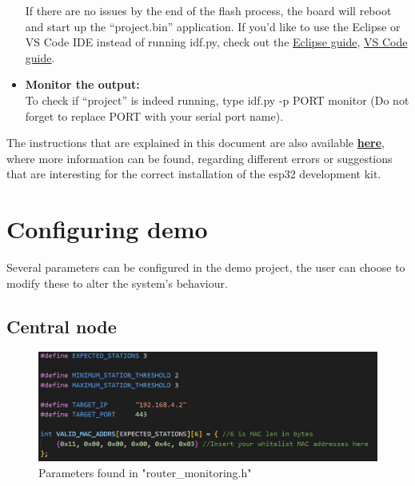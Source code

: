 \begin{itemize}
    If there are no issues by the end of the flash process, the board will reboot and start up the “project.bin” application.
    If you’d like to use the Eclipse or VS Code IDE instead of running idf.py, check out the \hyperlink{https://docs.espressif.com/projects/esp-idf/en/latest/esp32/get-started/eclipse-setup.html}{Eclipse guide}, \hyperlink{https://docs.espressif.com/projects/esp-idf/en/latest/esp32/get-started/vscode-setup.html}{VS Code guide}.\\
    
    \item \textbf{Monitor the output:}\\
    To check if “project” is indeed running, type idf.py -p PORT monitor (Do not forget to replace PORT with your serial port name).
    
\end{itemize}

The instructions that are explained in this document are also available \hyperlink{https://docs.espressif.com/projects/esp-idf/en/latest/esp32/get-started/linux-macos-setup.html}{\textbf{here}}, where more information can be found, regarding different errors or suggestions that are interesting for the correct installation of the esp32 development kit. 

\section{Configuring demo}

Several parameters can be configured in the demo project, the user can choose to modify these to alter the system's behaviour.

\subsection{Central node}

\begin{figure}[H]
\centering
\includegraphics[width=.9\linewidth]{images/router_monitoring_params.JPG}
\caption{Parameters found in "router\_monitoring.h"}
\label{fig:router_monitoring_params}
\end{figure}

